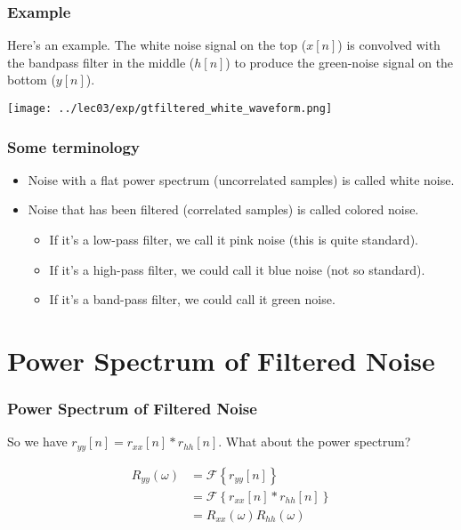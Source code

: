 \documentclass{beamer}
\begin{document}
\begin{frame}
  \frametitle{Example}

  Here's an example.  The white noise signal on the top ($x[n]$) is
  convolved with the bandpass filter in the middle ($h[n]$) to produce
  the green-noise signal on the bottom ($y[n]$).
  
  \centerline{\texttt{[image: ../lec03/exp/gtfiltered\_white\_waveform.png]}}
\end{frame}
\begin{frame}
  \frametitle{Some terminology}

  \begin{itemize}
    \item Noise with a flat power spectrum (uncorrelated samples) is
      called white noise.
    \item Noise that has been filtered (correlated samples) is called
      colored noise.
      \begin{itemize}
      \item If it's a low-pass filter, we call it pink noise (this is
        quite standard).
      \item If it's a high-pass filter, we could call it blue noise
        (not so standard).
      \item If it's a band-pass filter, we could call it green noise.
      \end{itemize}
  \end{itemize}
\end{frame}

\section[Spectrum]{Power Spectrum of Filtered Noise}
\setcounter{subsection}{1}

\begin{frame}
  \frametitle{Power Spectrum of Filtered Noise}

  So we have $r_{yy}[n]=r_{xx}[n]\ast r_{hh}[n]$.  What about the
  power spectrum?

  \begin{align*}
    R_{yy}(\omega) &= {\mathcal F}\left\{r_{yy}[n]\right\} \\
    &= {\mathcal F}\left\{r_{xx}[n]\ast r_{hh}[n]\right\} \\
    &= R_{xx}(\omega)R_{hh}(\omega)
  \end{align*}
\end{frame}
\end{document}
